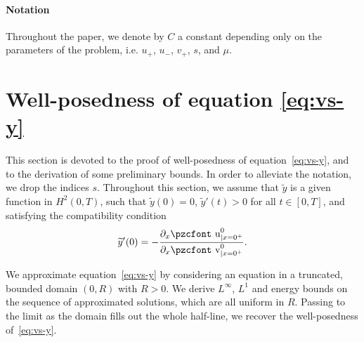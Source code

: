 \documentclass[10pt]{amsart}
\theoremstyle{definition}\newtheorem{defi}[theo]{Definition}\newtheorem{rema}[theo]{Remark}\newtheorem{exam}[theo]{Example}\newtheorem{exem}[theo]{Example}\newtheorem{nota}[theo]{Notation}
\newcommand{\mathpzc}[1]{\text{\pzcfont #1}}
\newcommand{\p}{\partial}
\newcommand{\tv}{\mathpzc{v}}
\newcommand{\tu}{\mathpzc{u}}
\newcommand{\ty}{\widetilde{y}}
\begin{document}
\paragraph{Notation}
Throughout the paper, we denote by $C$ a constant depending only on the parameters of the problem, i.e. $u_+$, $u_-$, $v_+$, $s$, and $\mu$.



\section{Well-posedness of equation \texorpdfstring{\eqref{eq:vs-y}}{eqv}}\label{sec:v-WP}


This section is devoted to the proof of well-posedness of equation~\eqref{eq:vs-y}, and to the derivation of some preliminary bounds. In order to alleviate the notation, we drop the indices $s$. Throughout this section, we assume that $\ty$ is a given function in $H^2(0,T)$, such that $\ty(0)=0$, $\ty'(t)>0$ for all $t\in [0,T]$, and satisfying the compatibility condition
\begin{equation}\label{compatibility-ty}
\ty'(0)=-\frac{\p_x \tu^0_{|x=0^+}}{\p_x \tv^0_{|x=0^+}}.
\end{equation}



We approximate equation~\eqref{eq:vs-y} by considering an equation in a truncated, bounded domain $(0,R)$ with $R>0$. We derive $L^\infty$, $L^1$ and energy bounds on the sequence of approximated solutions, which are all uniform in $R$. Passing to the limit as the domain fills out the whole half-line, we recover the well-posedness of~\eqref{eq:vs-y}.
\end{document}
